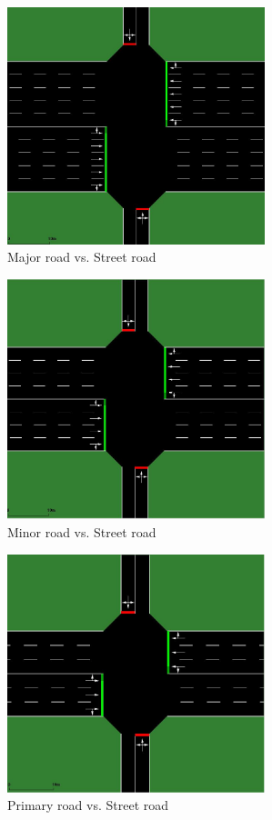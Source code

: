 \documentclass[conference]{IEEEtran}
\begin{document}
 \begin{figure}[h!]
     \centering
     \includegraphics[width=7.5cm]{MajorvsStreet.JPG}
     \caption{Major road vs. Street road}
     \label{fig:my_label}
 \end{figure} 

 \begin{figure}[h!]
     \centering
     \includegraphics[width=7.5cm]{MinorvsStreet.JPG}
     \caption{Minor road vs. Street road}
     \label{fig:my_label}
 \end{figure} 
 
 \begin{figure}[h!]
     \centering
     \includegraphics[width=7.5cm]{PrimaryvsStreet.JPG}
     \caption{Primary road vs. Street road}
     \label{fig:my_label}
 \end{figure} 
\end{document}

